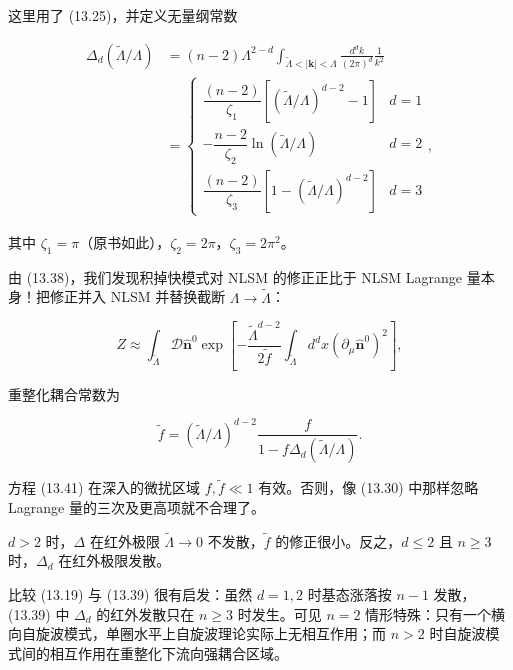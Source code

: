 这里用了 (13.25)，并定义无量纲常数

\begin{align*}
\Delta_ {d} ( \tilde {\Lambda} / \Lambda ) & = ( n - 2 ) \Lambda^ {2 - d} \int_{\tilde {\Lambda} < | \mathbf {k} | < \Lambda} \frac {d ^ {d} k}{( 2 \pi ) ^ {d}} \frac {1}{k ^ {2}}\\
& = \left\{ \begin{array}{ll} \dfrac {( n - 2 )}{\zeta_ {1}} \left[ ( \tilde {\Lambda} / \Lambda ) ^ {d - 2} - 1 \right] & d = 1 \\[4pt] - \dfrac {n - 2}{\zeta_ {2}} \ln ( \tilde {\Lambda} / \Lambda ) & d = 2 \\[4pt] \dfrac {( n - 2 )}{\zeta_ {3}} \left[ 1 - ( \tilde {\Lambda} / \Lambda ) ^ {d - 2} \right] & d = 3 \end{array} \right. ,
\tag{13.39}
\end{align*}

其中 $\zeta_1 = \pi$（原书如此），$\zeta_2 = 2\pi$，$\zeta_3 = 2\pi^2$。

由 (13.38)，我们发现积掉快模式对 NLSM 的修正正比于 NLSM Lagrange 量本身！把修正并入 NLSM 并替换截断 $\Lambda \rightarrow \tilde{\Lambda}$：

\begin{equation*}
Z \approx \int_{\tilde {\Lambda}} \mathcal {D} \hat {\mathbf {n}} ^ {0} \exp \left[ - \frac {\tilde {\Lambda} ^ {d - 2}}{2 \tilde {f}} \int_{\tilde {\Lambda}} d ^ {d} x \left( \partial_ {\mu} \hat {\mathbf {n}} ^ {0} \right) ^ {2} \right] ,
\tag{13.40}
\end{equation*}

重整化耦合常数为

\begin{equation*}
\tilde {f} = ( \tilde {\Lambda} / \Lambda ) ^ {d - 2} \frac {f}{1 - f \Delta_ {d} ( \tilde {\Lambda} / \Lambda )}.
\tag{13.41}
\end{equation*}

方程 (13.41) 在深入的微扰区域 $f, \tilde{f} \ll 1$ 有效。否则，像 (13.30) 中那样忽略 Lagrange 量的三次及更高项就不合理了。

$d > 2$ 时，$\Delta$ 在红外极限 $\tilde{\Lambda} \to 0$ 不发散，$\tilde{f}$ 的修正很小。反之，$d \leq 2$ 且 $n \geq 3$ 时，$\Delta_d$ 在红外极限发散。

比较 (13.19) 与 (13.39) 很有启发：虽然 $d=1,2$ 时基态涨落按 $n-1$ 发散，(13.39) 中 $\Delta_{d}$ 的红外发散只在 $n\geq3$ 时发生。可见 $n=2$ 情形特殊：只有一个横向自旋波模式，单圈水平上自旋波理论实际上无相互作用；而 $n>2$ 时自旋波模式间的相互作用在重整化下流向强耦合区域。

